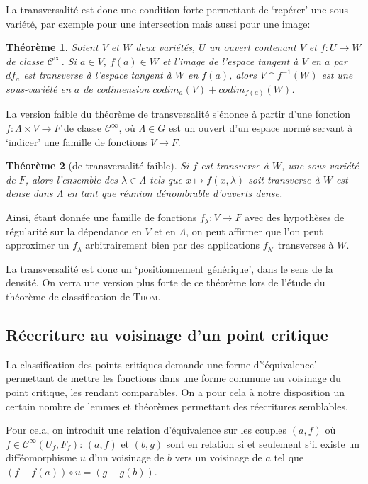 \documentclass{article}
\newcommand{\cinf}{\mathcal{C}^\infty}
\newtheorem{thm}{Théorème}
\theoremstyle{definition}
\begin{document}
La transversalité est donc une condition forte permettant de `repérer' une sous-variété, par exemple pour une intersection mais aussi pour une image:

\begin{thm}
	Soient $V$ et $W$ deux variétés, $U$ un ouvert contenant $V$ et $f:U\to W$ de classe $\cinf$.
	Si $a\in V$, $f(a)\in W$ et l'image de l'espace tangent à $V$ en $a$ par $df_a$ est transverse à l'espace tangent à $W$ en $f(a)$, alors $V\cap f^{-1}(W)$ est une sous-variété en $a$ de codimension $codim_a(V) + codim_{f(a)}(W)$.
\end{thm}

La version faible du théorème de transversalité s'énonce à partir d'une fonction $f: \Lambda\times V\to F$ de classe $\cinf$, où $\Lambda\in G$ est un ouvert d'un espace normé servant à `indicer' une famille de fonctions $V\to F$.

\begin{thm}[de transversalité faible]
	Si $f$ est transverse à $W$, une sous-variété de $F$, alors l'ensemble des $\lambda\in\Lambda$ tels que $x\mapsto f(x,\lambda)$ soit transverse à $W$ est dense dans $\Lambda$ en tant que réunion dénombrable d'ouverts dense.
\end{thm}

Ainsi, étant donnée une famille de fonctions $f_\lambda: V\to F$ avec des hypothèses de régularité sur la dépendance en $V$ et en $\Lambda$, on peut affirmer que l'on peut approximer un $f_\lambda$ arbitrairement bien par des applications $f_{\lambda'}$ transverses à $W$.

La transversalité est donc un `positionnement générique', dans le sens de la densité. On verra une version plus forte de ce théorème lors de l'étude du théorème de classification de \textsc{Thom}.

\subsection{Réecriture au voisinage d'un point critique}

La classification des points critiques demande une forme d'`équivalence' permettant de mettre les fonctions dans une forme commune au voisinage du point critique, les rendant comparables.
On a pour cela à notre disposition un certain nombre de lemmes et théorèmes permettant des réecritures semblables.

Pour cela, on introduit une relation d'équivalence sur les couples $(a,f)$ où $f\in\cinf(U_f,F_f)$: $(a,f)$ et $(b,g)$ sont en relation si et seulement s'il existe un difféomorphisme $u$ d'un voisinage de $b$ vers un voisinage de $a$ tel que $(f-f(a))\circ u = (g-g(b))$.
\end{document}
